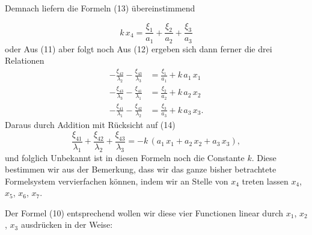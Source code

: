 Demnach liefern die Formeln (13) übereinstimmend

\[
k\,x_4 = \frac{\xi_1}{a_1} + \frac{\xi_2}{a_2} + \frac{\xi_3}{a_3}
\]
oder
Aus (11) aber folgt noch
Aus (12) ergeben sich dann ferner die drei Relationen
\[
\begin{aligned}
-\frac{\xi_{42}}{\lambda_2} - \frac{\xi_{43}}{\lambda_3} &= \frac{\xi_1}{a_1} + k\,a_1\,x_1 \\
-\frac{\xi_{43}}{\lambda_3} - \frac{\xi_{41}}{\lambda_1} &= \frac{\xi_2}{a_2} + k\,a_2\,x_2 \\
-\frac{\xi_{41}}{\lambda_1} - \frac{\xi_{42}}{\lambda_2} &= \frac{\xi_3}{a_3} + k\,a_3\,x_3.
\end{aligned}
\]
Daraus durch Addition mit Rücksicht auf (14)
\[
\frac{\xi_{41}}{\lambda_1} + \frac{\xi_{42}}{\lambda_2} + \frac{\xi_{43}}{\lambda_3} = -k\,(a_1\,x_1 + a_2\,x_2 + a_3\,x_3),
\]
und folglich
Unbekannt ist in diesen Formeln noch die Constante $k$. Diese bestimmen wir aus der Bemerkung, dass wir das ganze bisher betrachtete Formelsystem vervierfachen können, indem wir an Stelle von $x_4$ treten lassen $x_4$, $x_5$, $x_6$, $x_7$.

Der Formel (10) entsprechend wollen wir diese vier Functionen linear durch $x_1$, $x_2$, $x_3$ ausdrücken in der Weise:
